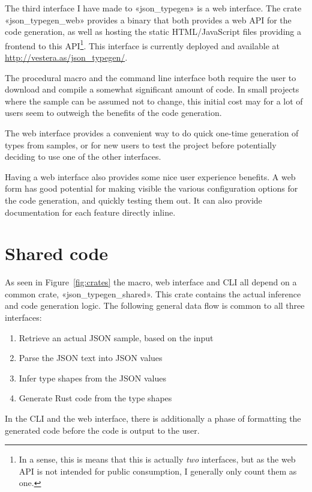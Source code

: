 The third interface I have made to «json_typegen» is a web interface. The crate «json_typegen_web» provides a binary that both provides a web API for the code generation, as well as hosting the static HTML/JavaScript files providing a frontend to this API\footnote{In a sense, this is means that this is actually \emph{two} interfaces, but as the web API is not intended for public consumption, I generally only count them as one.}. This interface is currently deployed and available at \url{http://vestera.as/json_typegen/}.

The procedural macro and the command line interface both require the user to download and compile a somewhat significant amount of code. In small projects where the sample can be assumed not to change, this initial cost may for a lot of users seem to outweigh the benefits of the code generation.

The web interface provides a convenient way to do quick one-time generation of types from samples, or for new users to test the project before potentially deciding to use one of the other interfaces.

Having a web interface also provides some nice user experience benefits. A web form has good potential for making visible the various configuration options for the code generation, and quickly testing them out. It can also provide documentation for each feature directly inline.

\section{Shared code}
\label{sec:shared-code}

As seen in Figure~\ref{fig:crates} the macro, web interface and CLI all depend on a common crate, «json_typegen_shared». This crate contains the actual inference and code generation logic. The following general data flow is common to all three interfaces:

\begin{enumerate}
  \item Retrieve an actual JSON sample, based on the input
  \item Parse the JSON text into JSON values
  \item Infer type shapes from the JSON values
  \item Generate Rust code from the type shapes
\end{enumerate}

In the CLI and the web interface, there is additionally a phase of formatting the generated code before the code is output to the user.

